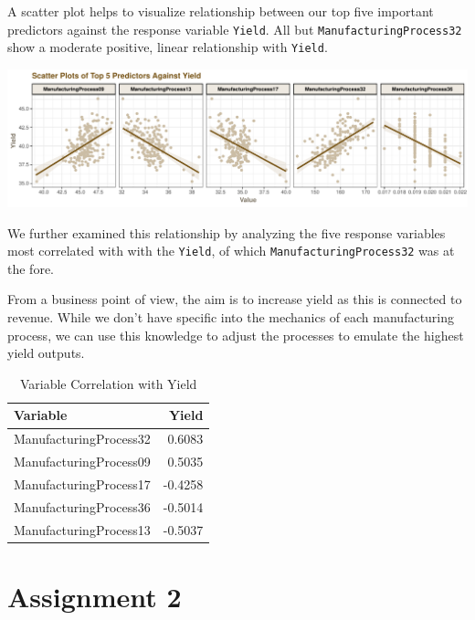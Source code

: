 \documentclass[]{report}
\begin{document}
A scatter plot helps to visualize relationship between our top five
important predictors against the response variable \texttt{Yield}. All
but \texttt{ManufacturingProcess32} show a moderate positive, linear
relationship with \texttt{Yield}.

\includegraphics{Homework-Two2_files/figure-latex/kj-6.3f-1-1.pdf}

We further examined this relationship by analyzing the five response
variables most correlated with with the \texttt{Yield}, of which
\texttt{ManufacturingProcess32} was at the fore.

From a business point of view, the aim is to increase yield as this is
connected to revenue. While we don't have specific into the mechanics of
each manufacturing process, we can use this knowledge to adjust the
processes to emulate the highest yield outputs.

\begin{table}[H]

\caption{\label{tab:kj-6.3f-2}Variable Correlation with Yield}
\centering
\fontsize{8}{10}\selectfont
\begin{tabular}[t]{lr}
\toprule
\textbf{Variable} & \textbf{Yield}\\
\midrule
\rowcolor{gray!6}  ManufacturingProcess32 & 0.6083\\
ManufacturingProcess09 & 0.5035\\
\rowcolor{gray!6}  ManufacturingProcess17 & -0.4258\\
ManufacturingProcess36 & -0.5014\\
\rowcolor{gray!6}  ManufacturingProcess13 & -0.5037\\
\bottomrule
\end{tabular}
\end{table}

\chapter*{Assignment 2}\label{AS-2}

\end{document}
